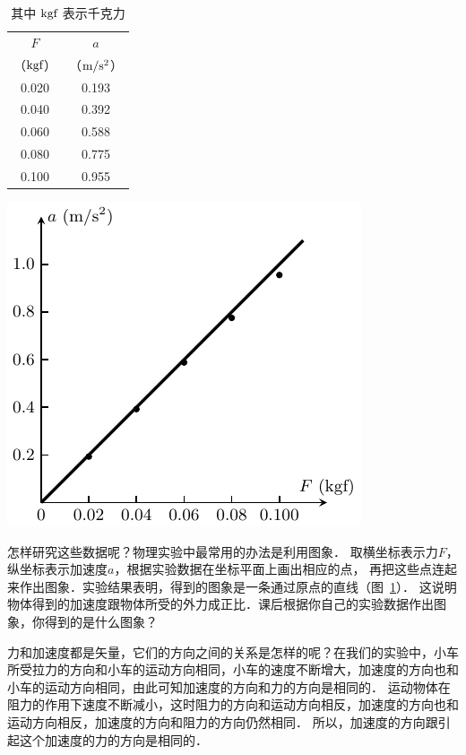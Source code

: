 \begin{table}[htbp]
	\centering
	\begin{minipage}[b]{0.45\linewidth}
		\centering
		\begin{tabular}{cc}
			\toprule
			$F$  & $a$ \\
			（$\text{kgf}$）&（$\text{m}/\text{s}^2$）\\
			\midrule
			0.020  &  0.193  \\
			0.040  &  0.392  \\
			0.060  &  0.588  \\
			0.080  &  0.775  \\
			0.100  &  0.955  \\
			\bottomrule
		\end{tabular}
		\caption{其中 $\text{kgf}$ 
			表示千克力}\label{tab_A_3-1}
	\end{minipage}
	\hfil
	\begin{minipage}[b]{0.45\linewidth}
		\centering
		\includegraphics{fig/A/3-4.pdf}
		\label{fig_A_3-4}
	\end{minipage}
\end{table}



怎样研究这些数据呢？物理实验中最常用的办法是利用图象．
取横坐标表示力$F$，纵坐标表示加速度$a$，根据实验数据在坐标平面上画出相应的点，
再把这些点连起来作出图象．实验结果表明，得到的图象是一条通过原点的直线（图~\ref{fig_A_3-4}）．
这说明物体得到的加速度跟物体所受的外力成正比．课后根据你自己的实验数据作出图象，你得到的是什么图象？




力和加速度都是矢量，它们的方向之间的关系是怎样的呢？在我们的实验中，小车所受拉力的方向和小车的运动方向相同，小车的速度不断增大，加速度的方向也和小车的运动方向相同，由此可知加速度的方向和力的方向是相同的．
运动物体在阻力的作用下速度不断减小，这时阻力的方向和运动方向相反，加速度的方向也和运动方向相反，加速度的方向和阻力的方向仍然相同．
所以，加速度的方向跟引起这个加速度的力的方向是相同的．

